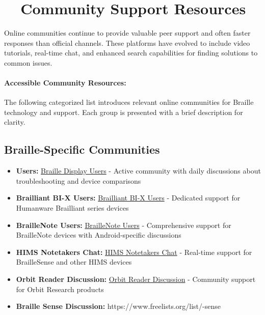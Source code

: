 \section{~~Community Support Resources}
\label{app2:listserv2}
Online communities continue to provide valuable peer support and often faster responses than official channels. These platforms have evolved to include video tutorials, real-time chat, and enhanced search capabilities for finding solutions to common issues.

\paragraph{Accessible Community Resources:}
The following categorized list introduces relevant online communities for Braille technology and  support. Each group is presented with a brief description for  clarity.

\subsection{Braille-Specific Communities}
\label{app2:braille-communities}
\begin{itemize}
	\item \textbf{ Users:} \href{https://groups.io/g/braille-display-users}{Braille Display Users} - Active community with daily discussions about troubleshooting and device comparisons
	\item \textbf{Brailliant BI-X Users:} \href{https://groups.io/g/Brailliant-BI-X-USERS/}{Brailliant BI-X Users} - Dedicated support for Humanware Brailliant series devices
	\item \textbf{BrailleNote Users:} \href{https://groups.io/g/braillenote}{BrailleNote Users} - Comprehensive support for BrailleNote devices with Android-specific discussions
	\item \textbf{HIMS Notetakers Chat:} \href{https://groups.io/g/hims-notetakers-chat}{HIMS Notetakers Chat} - Real-time support for BrailleSense and other HIMS devices
	\item \textbf{Orbit Reader Discussion:} \href{https://groups.io/g/orbit-reader}{Orbit Reader Discussion} - Community support for Orbit Research products
	\item \textbf{Braille Sense Discussion:} https://www.freelists.org/list/-sense
\end{itemize}

